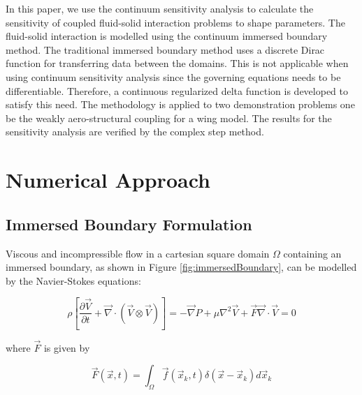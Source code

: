 \documentclass[12pt]{aiaa-pretty}
\begin{document}
In this paper, we use the continuum sensitivity analysis to calculate the sensitivity of coupled fluid-solid interaction problems to shape parameters. The fluid-solid interaction is modelled using the continuum immersed boundary method. The traditional immersed boundary method uses a discrete Dirac function for transferring data between the domains. This is not applicable when using continuum sensitivity analysis since the governing equations needs to be differentiable. Therefore, a continuous regularized delta function is developed to satisfy this need. The methodology is applied to two demonstration problems one be the weakly aero-structural coupling for a wing model. The results for the sensitivity analysis are verified by the complex step method.

\section{Numerical Approach}
\subsection{Immersed Boundary Formulation}
Viscous and incompressible flow in a cartesian square domain $\Omega$ containing an immersed boundary, as shown in Figure \eqref{fig:immersedBoundary}, can be modelled by the Navier-Stokes equations:

%
\begin{subequations}\label{eq:NS}
\begin{equation}
	\rho \left[
	\frac{\partial \vec{V}}{\partial t} + 
	\vec{\nabla} \cdot \left( \vec{V} \otimes \vec{V} \right) 
	\right] = 
	-\vec{\nabla} P + \mu \nabla^2 \vec{V} + \vec{F}
\end{equation}
\begin{equation}
	\vec{\nabla} \cdot \vec{V} = 0
\end{equation}
\end{subequations}
%

where $\vec{F}$ is given by

%
\begin{equation}\label{eq:forceAtEulerian}
	\vec{F}(\vec{x}, t) = \int_\Omega \vec{f} (\vec{x}_k, t) \delta(\vec{x} - \vec{x}_k) d\vec{x}_k
\end{equation}
%
\end{document}
